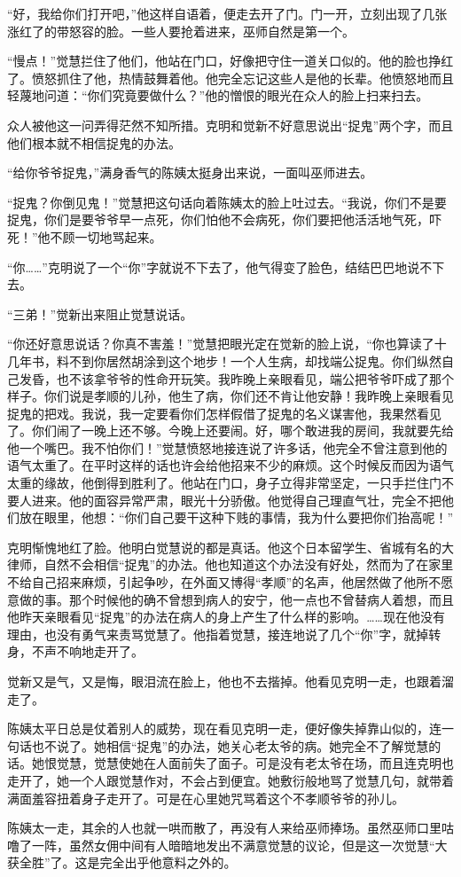 \par “好，我给你们打开吧，”他这样自语着，便走去开了门。门一开，立刻出现了几张涨红了的带怒容的脸。一些人要抢着进来，巫师自然是第一个。
\par “慢点！”觉慧拦住了他们，他站在门口，好像把守住一道关口似的。他的脸也挣红了。愤怒抓住了他，热情鼓舞着他。他完全忘记这些人是他的长辈。他愤怒地而且轻蔑地问道：“你们究竟要做什么？”他的憎恨的眼光在众人的脸上扫来扫去。
\par 众人被他这一问弄得茫然不知所措。克明和觉新不好意思说出“捉鬼”两个字，而且他们根本就不相信捉鬼的办法。
\par “给你爷爷捉鬼，”满身香气的陈姨太挺身出来说，一面叫巫师进去。
\par “捉鬼？你倒见鬼！”觉慧把这句话向着陈姨太的脸上吐过去。“我说，你们不是要捉鬼，你们是要爷爷早一点死，你们怕他不会病死，你们要把他活活地气死，吓死！”他不顾一切地骂起来。
\par “你……”克明说了一个“你”字就说不下去了，他气得变了脸色，结结巴巴地说不下去。
\par “三弟！”觉新出来阻止觉慧说话。
\par “你还好意思说话？你真不害羞！”觉慧把眼光定在觉新的脸上说，“你也算读了十几年书，料不到你居然胡涂到这个地步！一个人生病，却找端公捉鬼。你们纵然自己发昏，也不该拿爷爷的性命开玩笑。我昨晚上亲眼看见，端公把爷爷吓成了那个样子。你们说是孝顺的儿孙，他生了病，你们还不肯让他安静！我昨晚上亲眼看见捉鬼的把戏。我说，我一定要看你们怎样假借了捉鬼的名义谋害他，我果然看见了。你们闹了一晚上还不够。今晚上还要闹。好，哪个敢进我的房间，我就要先给他一个嘴巴。我不怕你们！”觉慧愤怒地接连说了许多话，他完全不曾注意到他的语气太重了。在平时这样的话也许会给他招来不少的麻烦。这个时候反而因为语气太重的缘故，他倒得到胜利了。他站在门口，身子立得非常坚定，一只手拦住门不要人进来。他的面容异常严肃，眼光十分骄傲。他觉得自己理直气壮，完全不把他们放在眼里，他想：“你们自己要干这种下贱的事情，我为什么要把你们抬高呢！”
\par 克明惭愧地红了脸。他明白觉慧说的都是真话。他这个日本留学生、省城有名的大律师，自然不会相信“捉鬼”的办法。他也知道这个办法没有好处，然而为了在家里不给自己招来麻烦，引起争吵，在外面又博得“孝顺”的名声，他居然做了他所不愿意做的事。那个时候他的确不曾想到病人的安宁，他一点也不曾替病人着想，而且他昨天亲眼看见“捉鬼”的办法在病人的身上产生了什么样的影响。……现在他没有理由，也没有勇气来责骂觉慧了。他指着觉慧，接连地说了几个“你”字，就掉转身，不声不响地走开了。
\par 觉新又是气，又是悔，眼泪流在脸上，他也不去揩掉。他看见克明一走，也跟着溜走了。
\par 陈姨太平日总是仗着别人的威势，现在看见克明一走，便好像失掉靠山似的，连一句话也不说了。她相信“捉鬼”的办法，她关心老太爷的病。她完全不了解觉慧的话。她恨觉慧，觉慧使她在人面前失了面子。可是没有老太爷在场，而且连克明也走开了，她一个人跟觉慧作对，不会占到便宜。她敷衍般地骂了觉慧几句，就带着满面羞容扭着身子走开了。可是在心里她咒骂着这个不孝顺爷爷的孙儿。
\par 陈姨太一走，其余的人也就一哄而散了，再没有人来给巫师捧场。虽然巫师口里咕噜了一阵，虽然女佣中间有人暗暗地发出不满意觉慧的议论，但是这一次觉慧“大获全胜”了。这是完全出乎他意料之外的。



